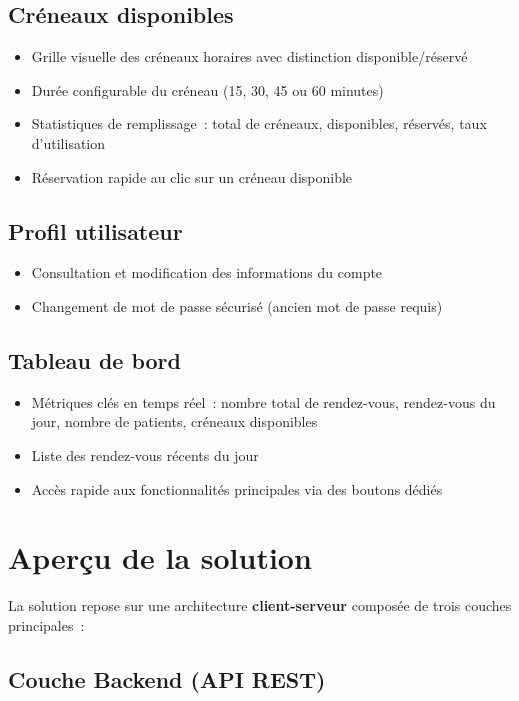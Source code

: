 \subsection{Créneaux disponibles}
\begin{itemize}
    \item Grille visuelle des créneaux horaires avec distinction disponible/réservé
    \item Durée configurable du créneau (15, 30, 45 ou 60 minutes)
    \item Statistiques de remplissage~: total de créneaux, disponibles, réservés, taux d'utilisation
    \item Réservation rapide au clic sur un créneau disponible
\end{itemize}

\subsection{Profil utilisateur}
\begin{itemize}
    \item Consultation et modification des informations du compte
    \item Changement de mot de passe sécurisé (ancien mot de passe requis)
\end{itemize}

\subsection{Tableau de bord}
\begin{itemize}
    \item Métriques clés en temps réel~: nombre total de rendez-vous, rendez-vous du jour, nombre de patients, créneaux disponibles
    \item Liste des rendez-vous récents du jour
    \item Accès rapide aux fonctionnalités principales via des boutons dédiés
\end{itemize}

\section{Aperçu de la solution}

La solution repose sur une architecture \textbf{client-serveur} composée de trois couches principales~:

\subsection{Couche Backend (API REST)}

